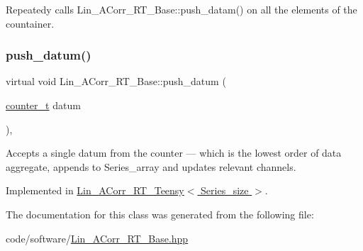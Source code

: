 Repeatedy calls {\ttfamily Lin\+\_\+\+A\+Corr\+\_\+\+R\+T\+\_\+\+Base\+::push\+\_\+datam()} on all the elements of the countainer. 

\mbox{\label{classLin__ACorr__RT__Base_a398167525faf2a65f29722e943a0c57e}} 
\subsubsection{\texorpdfstring{push\+\_\+datum()}{push\_datum()}}
{\footnotesize\ttfamily virtual void Lin\+\_\+\+A\+Corr\+\_\+\+R\+T\+\_\+\+Base\+::push\+\_\+datum (\begin{DoxyParamCaption}\item[{\hyperlink{types_8hpp_a22f279793847eba127de149437848c48}{counter\+\_\+t}}]{datum }\end{DoxyParamCaption})\hspace{0.3cm}{\ttfamily [inline]}, {}}



Accepts a single {\ttfamily datum} from the counter — which is the lowest order of data aggregate, appends to Series\+\_\+array and updates relevant channels. 



Implemented in \hyperlink{classLin__ACorr__RT__Teensy_a0172fa99b6318008a5e623fa9b2ccdcb}{Lin\+\_\+\+A\+Corr\+\_\+\+R\+T\+\_\+\+Teensy$<$ Series\+\_\+size $>$}.



The documentation for this class was generated from the following file\+:\begin{DoxyCompactItemize}
\item 
code/software/\hyperlink{Lin__ACorr__RT__Base_8hpp}{Lin\+\_\+\+A\+Corr\+\_\+\+R\+T\+\_\+\+Base.\+hpp}\end{DoxyCompactItemize}
